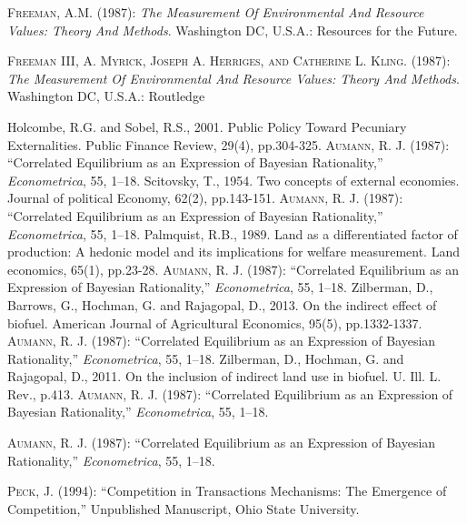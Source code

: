 \documentclass[ecta,nameyear,draft]{econsocart}
\theoremstyle{plain}
\theoremstyle{remark}
\begin{document}
\begin{thebibliography}{}
\textsc{Freeman, A.M.} (1987):
\textit{The Measurement Of Environmental And Resource Values: Theory And Methods}.
Washington DC, U.S.A.: Resources for the Future.
\endbibitem
 
\textsc{Freeman III, A. Myrick, Joseph A. Herriges, and Catherine L. Kling.} (1987):
\textit{The Measurement Of Environmental And Resource Values: Theory And Methods}.
Washington DC, U.S.A.: Routledge
\endbibitem 


Holcombe, R.G. and Sobel, R.S., 2001. Public Policy Toward Pecuniary Externalities. Public Finance Review, 29(4), pp.304-325. 
\textsc{Aumann, R. J.} (1987):
``Correlated Equilibrium as an Expression of Bayesian Rationality,''
\textit{Econometrica}, 55, 1--18.
\endbibitem
Scitovsky, T., 1954. Two concepts of external economies. Journal of political Economy, 62(2), pp.143-151. 
\textsc{Aumann, R. J.} (1987):
``Correlated Equilibrium as an Expression of Bayesian Rationality,''
\textit{Econometrica}, 55, 1--18.
\endbibitem
Palmquist, R.B., 1989. Land as a differentiated factor of production: A hedonic model and its implications for welfare measurement. Land economics, 65(1), pp.23-28. 
\textsc{Aumann, R. J.} (1987):
``Correlated Equilibrium as an Expression of Bayesian Rationality,''
\textit{Econometrica}, 55, 1--18.
\endbibitem
Zilberman, D., Barrows, G., Hochman, G. and Rajagopal, D., 2013. On the indirect effect of biofuel. American Journal of Agricultural Economics, 95(5), pp.1332-1337. 
\textsc{Aumann, R. J.} (1987):
``Correlated Equilibrium as an Expression of Bayesian Rationality,''
\textit{Econometrica}, 55, 1--18.
\endbibitem
Zilberman, D., Hochman, G. and Rajagopal, D., 2011. On the inclusion of indirect land use in biofuel. U. Ill. L. Rev., p.413. 
\textsc{Aumann, R. J.} (1987):
``Correlated Equilibrium as an Expression of Bayesian Rationality,''
\textit{Econometrica}, 55, 1--18.
\endbibitem

\textsc{Aumann, R. J.} (1987):
``Correlated Equilibrium as an Expression of Bayesian Rationality,''
\textit{Econometrica}, 55, 1--18.
\endbibitem

\textsc{Peck, J.} (1994):
``Competition in Transactions Mechanisms: The Emergence of Competition,''
Unpublished Manuscript, Ohio State University.
\endbibitem


\end{thebibliography}
\end{document}
